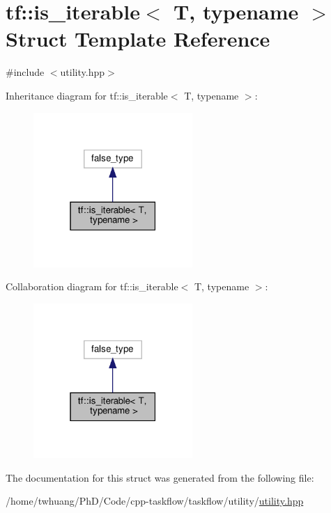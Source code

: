 \hypertarget{structtf_1_1is__iterable}{}\section{tf\+:\+:is\+\_\+iterable$<$ T, typename $>$ Struct Template Reference}
\label{structtf_1_1is__iterable}


{\ttfamily \#include $<$utility.\+hpp$>$}



Inheritance diagram for tf\+:\+:is\+\_\+iterable$<$ T, typename $>$\+:\nopagebreak
\begin{figure}[H]
\begin{center}
\leavevmode
\includegraphics[width=171pt]{structtf_1_1is__iterable__inherit__graph}
\end{center}
\end{figure}


Collaboration diagram for tf\+:\+:is\+\_\+iterable$<$ T, typename $>$\+:\nopagebreak
\begin{figure}[H]
\begin{center}
\leavevmode
\includegraphics[width=171pt]{structtf_1_1is__iterable__coll__graph}
\end{center}
\end{figure}


The documentation for this struct was generated from the following file\+:\begin{DoxyCompactItemize}
\item 
/home/twhuang/\+Ph\+D/\+Code/cpp-\/taskflow/taskflow/utility/\hyperlink{utility_8hpp}{utility.\+hpp}\end{DoxyCompactItemize}
